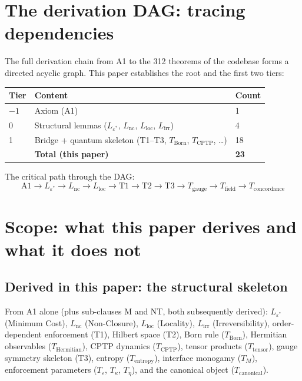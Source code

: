 \documentclass[11pt]{article}
\begin{document}
\section{The derivation DAG: tracing dependencies}

The full derivation chain from A1 to the 312 theorems of the codebase forms a directed acyclic graph.  This paper establishes the root and the first two tiers:

\begin{center}
\begin{tabular}{lll}
\toprule
\textbf{Tier} & \textbf{Content} & \textbf{Count} \\
\midrule
$-1$ & Axiom (A1) & 1 \\
0 & Structural lemmas ($L_{\varepsilon^*}$, $L_{\mathrm{nc}}$, $L_{\mathrm{loc}}$, $L_{\mathrm{irr}}$) & 4 \\
1 & Bridge + quantum skeleton (T1--T3, $T_{\mathrm{Born}}$, $T_{\mathrm{CPTP}}$, \ldots) & 18 \\
\midrule
& \textbf{Total (this paper)} & \textbf{23} \\
\bottomrule
\end{tabular}
\end{center}

The critical path through the DAG:
\[
\text{A1} \to L_{\varepsilon^*} \to L_{\mathrm{nc}} \to L_{\mathrm{loc}} \to \text{T1} \to \text{T2} \to \text{T3} \to T_{\mathrm{gauge}} \to T_{\mathrm{field}} \to T_{\mathrm{concordance}}
\]


\section{Scope: what this paper derives and what it does not}

\subsection{Derived in this paper: the structural skeleton}

From A1 alone (plus sub-clauses M and NT, both subsequently derived): $L_{\varepsilon^*}$ (Minimum Cost), $L_{\mathrm{nc}}$ (Non-Closure), $L_{\mathrm{loc}}$ (Locality), $L_{\mathrm{irr}}$ (Irreversibility), order-dependent enforcement (T1), Hilbert space (T2), Born rule ($T_{\mathrm{Born}}$), Hermitian observables ($T_{\mathrm{Hermitian}}$), CPTP dynamics ($T_{\mathrm{CPTP}}$), tensor products ($T_{\mathrm{tensor}}$), gauge symmetry skeleton (T3), entropy ($T_{\mathrm{entropy}}$), interface monogamy ($T_M$), enforcement parameters ($T_\varepsilon$, $T_\kappa$, $T_\eta$), and the canonical object ($T_{\mathrm{canonical}}$).
\end{document}
